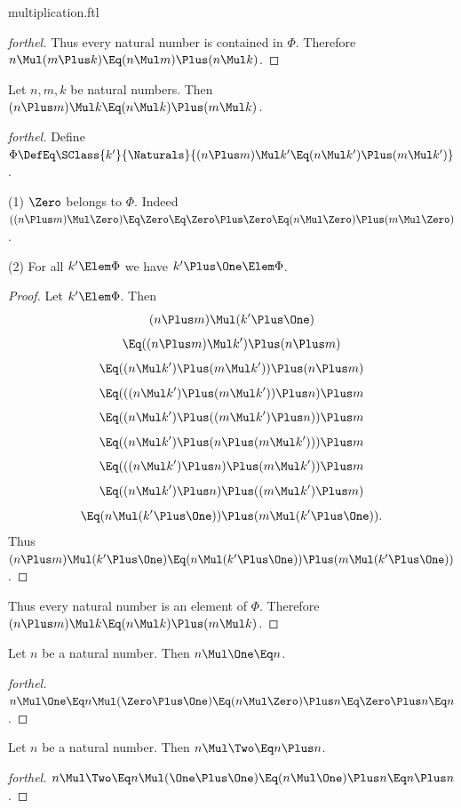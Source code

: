 \documentclass{stex}
\begin{document}
\begin{smodule}{multiplication.ftl}
\begin{proof}[forthel]
  Thus every natural number is contained in $\Phi$.
  Therefore $n \Mul (m \Plus k) \Eq (n \Mul m) \Plus (n \Mul k)$.
\end{proof}

\begin{proposition*}[forthel]
  Let $n, m, k$ be natural numbers.
  Then $(n \Plus m) \Mul k \Eq (n \Mul k) \Plus (m \Mul k)$.
\end{proposition*}
\begin{proof}[forthel]
  Define $\Phi \DefEq \SClass{k'}{\Naturals}{(n \Plus m) \Mul k' \Eq (n \Mul k') \Plus (m \Mul k')}$.

  (1) $\Zero$ belongs to $\Phi$.
  Indeed $((n \Plus m) \Mul \Zero)
    \Eq \Zero
    \Eq \Zero \Plus \Zero
    \Eq (n \Mul \Zero) \Plus (m \Mul \Zero)$.

  (2) For all $k' \Elem \Phi$ we have $k' \Plus \One \Elem \Phi$.
  \begin{proof}
    Let $k' \Elem \Phi$.
    Then
    \[  (n \Plus m) \Mul (k' \Plus \One)                        \]
    \[    \Eq ((n \Plus m) \Mul k') \Plus (n \Plus m)              \]
    \[    \Eq ((n \Mul k') \Plus (m \Mul k')) \Plus (n \Plus m)   \]
    \[    \Eq (((n \Mul k') \Plus (m \Mul k')) \Plus n) \Plus m   \]
    \[    \Eq ((n \Mul k') \Plus ((m \Mul k') \Plus n)) \Plus m   \]
    \[    \Eq ((n \Mul k') \Plus (n \Plus (m \Mul k'))) \Plus m   \]
    \[    \Eq (((n \Mul k') \Plus n) \Plus (m \Mul k')) \Plus m   \]
    \[    \Eq ((n \Mul k') \Plus n) \Plus ((m \Mul k') \Plus m)   \]
    \[    \Eq (n \Mul (k' \Plus \One)) \Plus (m \Mul (k' \Plus \One)).  \]
    Thus $(n \Plus m) \Mul (k' \Plus \One) \Eq (n \Mul (k' \Plus \One)) \Plus (m \Mul (k' \Plus \One))$.
  \end{proof}

  Thus every natural number is an element of $\Phi$.
  Therefore $(n \Plus m) \Mul k \Eq (n \Mul k) \Plus (m \Mul k)$.
\end{proof}

\begin{proposition*}[forthel]
  Let $n$ be a natural number.
  Then $n \Mul \One \Eq n$.
\end{proposition*}
\begin{proof}[forthel]
  $n \Mul \One
    \Eq n \Mul (\Zero \Plus \One)
    \Eq (n \Mul \Zero) \Plus n
    \Eq \Zero \Plus n
    \Eq n$.
\end{proof}

\begin{proposition*}[forthel]
  Let $n$ be a natural number.
  Then $n \Mul \Two \Eq n \Plus n$.
\end{proposition*}
\begin{proof}[forthel]
  $n \Mul \Two
    \Eq n \Mul (\One \Plus \One)
    \Eq (n \Mul \One) \Plus n
    \Eq n \Plus n$.
\end{proof}


\end{smodule}
\end{document}
